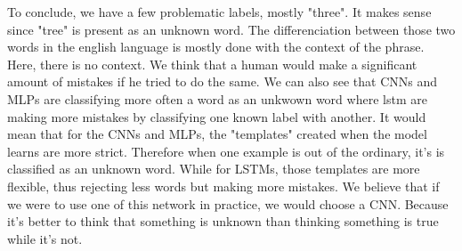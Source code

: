 To conclude, we have a few problematic labels, mostly "three". It makes sense since "tree" is present as an unknown word. The differenciation between those two words in the english language is mostly done with the context of the phrase. Here, there is no context. We think that a human would make a significant amount of mistakes if he tried to do the same. We can also see that CNNs and MLPs are classifying more often a word as an unkwown word where lstm are making more mistakes by classifying one known label with another. It would mean that for the CNNs and MLPs, the "templates" created when the model learns are more strict. Therefore when one example is out of the ordinary, it's is classified as an unknown word. While for LSTMs, those templates are more flexible, thus rejecting less words but making more mistakes. We believe that if we were to use one of this network in practice, we would choose a CNN. Because it's better to think that something is unknown than thinking something is true while it's not.